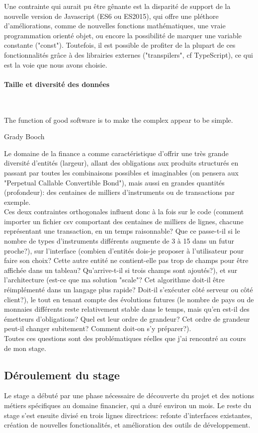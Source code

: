 \documentclass[a4paper,french,12pt]{article}
\begin{document}
 Une contrainte qui aurait pu être gênante est la disparité de support de la nouvelle version de Javascript (ES6 ou ES2015), qui offre une pléthore d'améliorations, comme de nouvelles fonctions mathématiques, une vraie programmation orienté objet, ou encore la possibilité de marquer une variable constante ("const").
 Toutefois, il est possible de profiter de la plupart de ces fonctionnalités grâce à des librairies externes ("transpilers", cf TypeScript), ce qui est la voie que nous avons choisie. 

	
		\paragraph{Taille et diversité des données} ~\\
		\epigraph{The function of good software is to make the complex appear to be simple.}{Grady Booch}

		Le domaine de la finance a comme caractéristique d'offrir une très grande diversité d'entités (largeur), allant des obligations aux produits structurés en passant par toutes les combinaisons possibles et imaginables (on pensera aux "Perpetual Callable Convertible Bond"), mais aussi en grandes quantités (profondeur): des centaines de milliers d'instruments ou de transactions par exemple.~\\
		Ces deux contraintes orthogonales influent donc à la fois sur le code (comment importer un fichier csv comportant des centaines de milliers de lignes, chacune représentant une transaction, en un temps raisonnable? Que ce passe-t-il si le nombre de types d'instruments différents augmente de 3 à 15 dans un futur proche?), sur l'interface (combien d'entités dois-je proposer à l'utilisateur pour faire son choix? Cette autre entité ne contient-elle pas trop de champs pour être affichée dans un tableau? Qu'arrive-t-il si trois champs sont ajoutés?), et sur l'architecture (est-ce que ma solution "scale"? Cet algorithme doit-il être réimplémenté dans un langage plus rapide? Doit-il s'exécuter côté serveur ou côté client?), le tout en tenant compte des évolutions futures (le nombre de pays ou de monnaies différents reste relativement stable dans le temps, mais qu'en est-il des émetteurs d'obligations? Quel est leur ordre de grandeur? Cet ordre de grandeur peut-il changer subitement? Comment doit-on s'y préparer?).~\\
		Toutes ces questions sont des problématiques réelles que j'ai rencontré au cours de mon stage.


	\subsection{Déroulement du stage}
		Le stage a débuté par une phase nécessaire de découverte du projet et des notions métiers spécifiques au domaine financier, qui a duré environ un mois. Le reste du stage s'est ensuite divisé en trois lignes directrices: refonte d'interfaces existantes, création de nouvelles fonctionalités, et amélioration des outils de développement.
	
\end{document}
